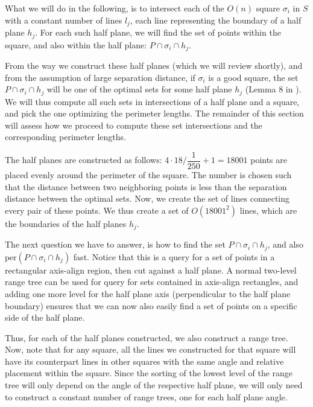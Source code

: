 \documentclass{article}
\begin{document}
What we will do in the following, is to intersect each of the $O(n)$ square $\sigma_i$ in $S$ with a constant number of lines $l_j$, each line representing the boundary of a half plane $h_j$. For each such half plane, we will find the set of points within the square, and also within the half plane: $P \cap \sigma_i \cap h_j$. 

From the way we construct these half planes (which we will review shortly), and from the assumption of large separation distance, if $\sigma_i$ is a good square, the set $P \cap \sigma_i \cap h_j$ will be one of the optimal sets for some half plane $h_j$ (Lemma 8 in \cite{abb17}). We will thus compute all such sets in intersections of a half plane and a square, and pick the one optimizing the perimeter lengths. The remainder of this section will assess how we proceed to compute these set intersections and the corresponding perimeter lengths.

The half planes are constructed as follows: $4 \cdot 18 / \dfrac{1}{250} + 1 = 18001$ points are placed evenly around the perimeter of the square. The number is chosen such that the distance between two neighboring points is less than the separation distance between the optimal sets. Now, we create the set of lines connecting every pair of these points. We thus create a set of $O(18001^2)$ lines, which are the boundaries of the half planes $h_j$.

The next question we have to answer, is how to find the set $P \cap \sigma_i \cap h_j$, and also $\text{per}(P \cap \sigma_i \cap h_j)$ fast. Notice that this is a query for a set of points in a rectangular axis-align region, then cut against a half plane. A normal two-level range tree \cite{range_trees} can be used for query for sets contained in axis-align rectangles, and adding one more level for the half plane axis (perpendicular to the half plane boundary) ensures that we can now also easily find a set of points on a specific side of the half plane. 

Thus, for each of the half planes constructed, we also construct a range tree. Now, note that for any square, all the lines we constructed for that square will have its counterpart lines in other squares with the same angle and relative placement within the square. Since the sorting of the lowest level of the range tree will only depend on the angle of the respective half plane, we will only need to construct a constant number of range trees, one for each half plane angle. 
\end{document}
